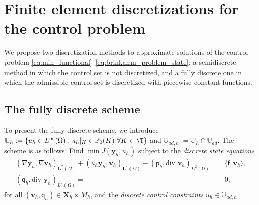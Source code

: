 \documentclass[final]{siamart0216}
\begin{document}
\section{Finite element discretizations for the control problem}
We propose two discretization methods to approximate solutions of the control problem \eqref{eq:min_functional}--\eqref{eq:brinkamn_problem_state}: a semidiscrete method in which the control set is not discretized, and a fully discrete one in which the admissible control set is discretized with piecewise constant functions.

\subsection{The fully discrete scheme}
\label{fully_discrete_framework}
To present the fully discrete scheme, we introduce
$
\mathbb{U}_h:=\{u_{h}\in L^{\infty}(\Omega):u_{h}|_{K}\in\mathbb{P}_0(K)~\forall K\in\T\}
$
and $\mathbb{U}_{ad,h}:= \mathbb{U}_h\cap \mathbb{U}_{ad}$. The scheme is as follows: Find $\min J(\mathbf{y}_{h},u_{h})$ subject to the \emph{discrete state equations}
\begin{equation}\label{eq:brinkamn_problem_state_fd}
\begin{array}{rl}
(\nabla \mathbf{y}_{h},\nabla \mathbf{v}_{h})_{\mathbf{L}^2(\Omega)}
+
( u_{h}\mathbf{y}_{h}, \mathbf{v}_{h})_{\mathbf{L}^2(\Omega)}
-
(\mathsf{p}_{h},\text{div }\mathbf{v}_{h})_{L^2(\Omega)}
=& \langle \mathbf{f},\mathbf{v}_{h} \rangle,\\
(\mathsf{q}_{h},\text{div }\mathbf{y}_{h})_{L^2(\Omega)} =&  0,
\end{array}
\end{equation}
for all $(\mathbf{v}_{h},\mathsf{q}_{h}) \in \mathbf{X}_h \times M_h$, and the \emph{discrete control constraints} $u_{h}\in\mathbb{U}_{ad,h}$.
\end{document}
